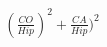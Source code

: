\documentclass[preview]{standalone}
\begin{document}
\begin{align*}
(\frac{CO}{Hip})^2+\frac{CA}{Hip})^2
\end{align*}
\end{document}
